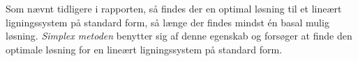 Som nævnt tidligere i rapporten, så findes der en optimal løsning til et lineært ligningssystem på standard form, så længe der findes mindst én basal mulig løsning. 
\textit{Simplex metoden} benytter sig af denne egenskab og forsøger at finde den optimale løsning for en lineært ligningssystem på standard form.
%
%
%
%
%
%
%
%
%
